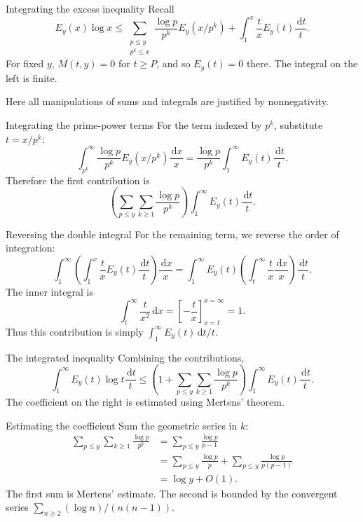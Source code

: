 \documentclass[aspectratio=169,11pt]{beamer}
\newcommand{\dd}{\,\mathrm d}
\begin{document}
\begin{frame}{Integrating the excess inequality}
Recall
\[E_y(x)\log x\le\sum_{\substack{p\le y\\p^k\le x}}\frac{\log p}{p^k}E_y(x/p^k)
+\int_1^x\frac tx E_y(t)\frac{\dd t}t.\]
For fixed $y$, $M(t,y)=0$ for $t\ge P$, and so $E_y(t)=0$ there. The integral on the left is finite.

Here all manipulations of sums and integrals are justified by nonnegativity.
\end{frame}
\begin{frame}{Integrating the prime-power terms}
For the term indexed by $p^k$, substitute $t=x/p^k$:
\[\int_{p^k}^\infty\frac{\log p}{p^k}E_y(x/p^k)\frac{\dd x}x
=\frac{\log p}{p^k}\int_1^\infty E_y(t)\frac{\dd t}t.\]
Therefore the first contribution is
\[\left(\sum_{p\le y}\sum_{k\ge1}\frac{\log p}{p^k}\right)
\int_1^\infty E_y(t)\frac{\dd t}t.\]
\end{frame}
\begin{frame}{Reversing the double integral}
For the remaining term, we reverse the order of integration:
\[\int_1^\infty\left(\int_1^x\frac tx E_y(t)\frac{\dd t}t\right)\frac{\dd x}x
=\int_1^\infty E_y(t)\left(\int_t^\infty\frac tx\frac{\dd x}x\right)\frac{\dd t}t.\]
The inner integral is
\[\int_t^\infty\frac t{x^2}\dd x=\left[-\frac tx\right]_{x=t}^{x=\infty}=1.\]
Thus this contribution is simply $\int_1^\infty E_y(t)\dd t/t$.
\end{frame}
\begin{frame}{The integrated inequality}
Combining the contributions,
\[\int_1^\infty E_y(t)\log t\frac{\dd t}t
\le\left(1+\sum_{p\le y}\sum_{k\ge1}\frac{\log p}{p^k}\right)
\int_1^\infty E_y(t)\frac{\dd t}t.\]
The coefficient on the right is estimated using Mertens' theorem.
\end{frame}
\begin{frame}{Estimating the coefficient}
Sum the geometric series in $k$:
\begin{align*}
\sum_{p\le y}\sum_{k\ge1}\frac{\log p}{p^k}
&=\sum_{p\le y}\frac{\log p}{p-1}\\
&=\sum_{p\le y}\frac{\log p}p+\sum_{p\le y}\frac{\log p}{p(p-1)}\\
&=\log y+O(1).
\end{align*}
The first sum is Mertens' estimate. The second is bounded by the convergent series $\sum_{n\ge2}(\log n)/(n(n-1))$.
\end{frame}
\end{document}
